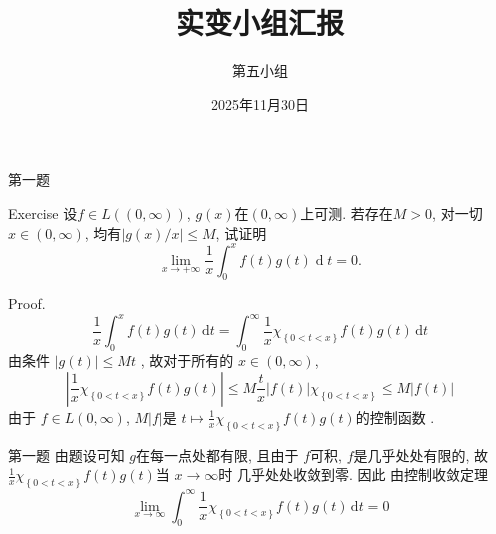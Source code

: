 \documentclass{beamer}
\title{实变小组汇报}
\author{第五小组}
\date{2025年11月30日}
\begin{document}
\maketitle



\begin{frame}[fragile]{第一题}
\begin{block}{Exercise}
设$f\in L((0,\infty))$, $g(x)$在$(0,\infty)$上可测. 若存在$M>0$, 对一切$x\in(0,\infty)$, 均有$|g(x)/x|\leq M$, 试证明
\[
\lim_{x\to +\infty}\frac{1}{x}\int_{0}^{x}f(t)g(t)\operatorname{d}t=0.
\]
\end{block}
Proof.    \[
  \frac{1 }{x }\int_{0}^{x}f\left( t \right)g\left( t \right)\,\mathrm{d} t= \int_{0}^{\infty}\frac{1 }{x }\chi _{\left\{ 0< t< x\right\}}f\left( t \right)g\left( t \right)\,\mathrm{d} t      
  \]由条件 \(  \left| g\left(t \right)  \right|\le Mt   \) , 故对于所有的 \(  x\in \left( 0,\infty \right)   \), \[
  \left| \frac{1 }{x }\chi _{\left\{ 0<t< x  \right\}}  f\left( t \right)g\left( t \right)  \right|\le M\frac{t }{x }\left| f\left( t \right)  \right|   \chi _{\left\{ 0< t< x \right\}}\le M\left| f\left( t \right)  \right| 
  \] 由于 \(  f\in L\left( 0,\infty \right)   \),  \(  M\left| f \right|   \)是 \(  t\mapsto \frac{1 }{x }\chi _{\left\{ 0< t< x \right\}}f\left( t \right)g\left( t \right)     \)的控制函数 . 
    
\end{frame}


\begin{frame}[fragile]{第一题}
由题设可知 \(  g  \)在每一点处都有限, 且由于 \(  f  \)可积,  \(  f  \)是几乎处处有限的, 故 \( \frac{1 }{x }\chi _{\left\{ 0< t< x \right\}}f\left( t \right)g\left( t \right)   \)当 \(  x\to \infty  \)时 几乎处处收敛到零.  因此   由控制收敛定理   \[
  \lim_{x\to \infty}\int_{0}^{\infty}\frac{1 }{x }\chi _{\left\{ 0< t< x \right\}}f\left( t \right)g\left( t \right)\,\mathrm{d} t=0
  \] 
\end{frame}
\end{document}
